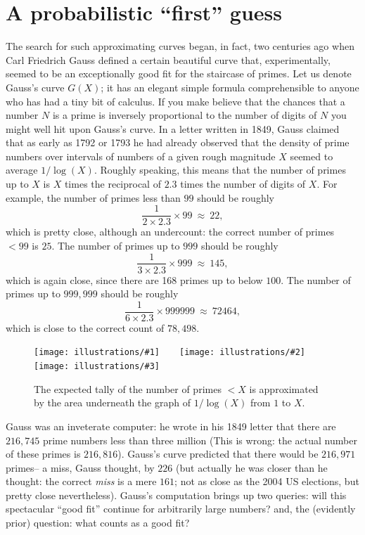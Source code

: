 \documentclass[11pt,draft]{article}
\newcommand{\illthree}[5]{ 
   \begin{figure}[H]
   \begin{center}
   \texttt{[image: illustrations/\#1]}$\qquad$\texttt{[image: illustrations/\#2]}$\qquad$\texttt{[image: illustrations/\#3]}
   \caption{#5}
    \end{center}
    \end{figure}
}
\theoremstyle{plain}
\theoremstyle{definition}
\numberwithin{equation}{section}
\numberwithin{figure}{section}
\numberwithin{table}{section}
\begin{document}
\section{A probabilistic ``first'' guess }
The search for such approximating curves began, in fact, two centuries
ago when Carl Friedrich Gauss defined a certain beautiful curve that,
experimentally, seemed to be an exceptionally good fit for the
staircase of primes. Let us denote Gauss's curve $G(X)$; it has an
elegant simple formula comprehensible to anyone who has had a tiny bit
of calculus.  If you make believe that the chances that a number $N$ is
a prime is inversely proportional to the number of digits of $N$ you
might well hit upon Gauss's curve.   In a letter written in 1849, Gauss
claimed that as early as 1792 or 1793 he had already observed that the
density of prime numbers over intervals of numbers of a given rough
magnitude $X$ seemed to average $1/\log(X)$.  Roughly speaking, this
means that the number of primes up to $X$ is $X$ times the reciprocal 
of $2.3$ times the number of digits of $X$.  For example,
the number of primes less than $99$ should be roughly
$$
   {\frac{1}{2\times 2.3}}\times 99\ \approx \ 22,
$$   
which is pretty close, although an undercount: the correct number of
primes $< 99$ is $25$.  The number of primes up to $999$ should
be roughly
$$
   {\frac{1}{3\times 2.3}}\times 999\ \approx \ 145,
$$   
which is again close, since there are 168 primes up to below $100$. 
The number of primes up to $999,\!999$ should be roughly
$$
   {\frac{1}{6\times 2.3}}\times 999999\ \approx \ 72464,
$$   
which is close to the correct count of $78,\!498$.

\illthree{area_under_graph_30}{area_under_graph_100}{area_under_graph_1000}{.3}{The
  expected tally of the number of primes $<X$ is approximated by the
  area underneath the graph of $1/\log(X)$ from $1$ to $X$.}

           
Gauss was an inveterate computer: he wrote in his 1849 letter that
there are $216,\!745$ prime numbers less than three million (This is
wrong: the actual number of these primes is $216,\!816$). Gauss's curve
predicted that there would be $216,\!971$ primes-- a miss, Gauss
thought, by $226$ (but actually he was closer than he thought: the
correct {\em miss} is a mere $161$; not as close as the 2004 US
elections, but pretty close nevertheless).  
Gauss's computation brings up two queries: will this spectacular ``good
fit'' continue for arbitrarily large numbers? and, the (evidently
prior) question: what counts as a good fit?
\end{document}
